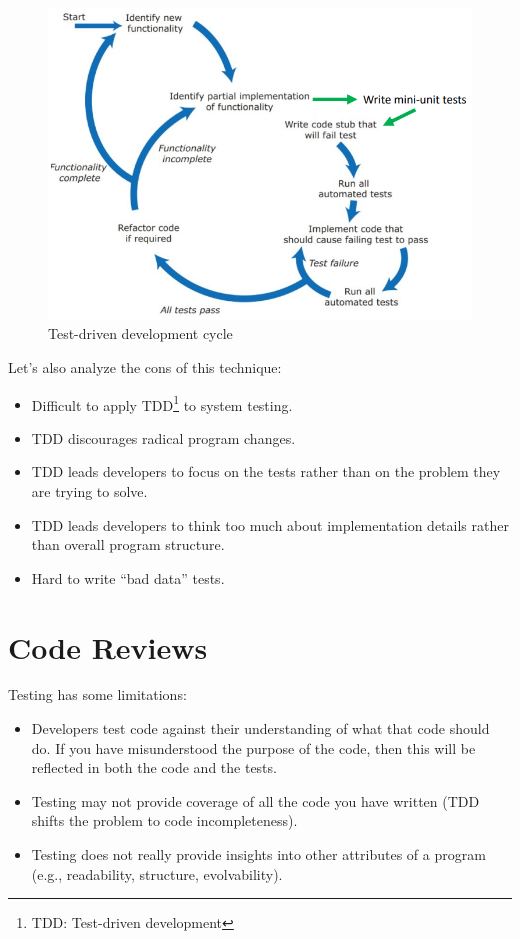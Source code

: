 \begin{figure} [H]
    \centering
    \includegraphics[width=1\textwidth]{images/Testing/test-driven-development.PNG}
    \caption{Test-driven development cycle}
    \label{fig:test-driven-development}
\end{figure} 

\noindent Let's also analyze the cons of this technique:

\begin{itemize}
    \item Difficult to apply TDD\footnote{TDD: Test-driven development} to system testing.
    \item TDD discourages radical program changes.
    \item TDD leads developers to focus on the tests rather than on the problem they are trying to solve.
    \item TDD leads developers to think too much about implementation details rather than overall program structure.
    \item Hard to write “bad data” tests.
\end{itemize}

\newpage

\section{Code Reviews}

Testing has some limitations:

\begin{itemize}
    \item Developers test code against their understanding of what that code should do. If you have misunderstood the purpose of the code, then this will be reflected in both the code and the tests.
    \item Testing may not provide coverage of all the code you have written (TDD shifts the problem to code incompleteness).
    \item Testing does not really provide insights into other attributes of a program (e.g., readability, structure, evolvability).
\end{itemize}


